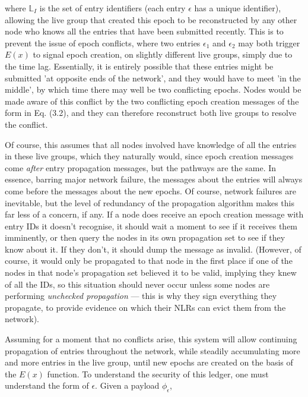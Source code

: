 \documentclass{extreport}
\begin{document}
where \(\mathbb{L}_I\) is the set of entry identifiers (each entry \(\epsilon\) has a unique identifier), allowing the live group that created this epoch to be reconstructed by any other node who knows all the entries that have been submitted recently. This is to prevent the issue of epoch conflicts, where two entries \(\epsilon_1\) and \(\epsilon_2\) may both trigger \(E(x)\) to signal epoch creation, on slightly different live groups, simply due to the time lag. Essentially, it is entirely possible that these entries might be submitted 'at opposite ends of the network', and they would have to meet 'in the middle', by which time there may well be two conflicting epochs. Nodes would be made aware of this conflict by the two conflicting epoch creation messages of the form in Eq. (3.2), and they can therefore reconstruct both live groups to resolve the conflict.

Of course, this assumes that all nodes involved have knowledge of all the entries in these live groups, which they naturally would, since epoch creation messages come \emph{after} entry propagation messages, but the pathways are the same. In essence, barring major network failure, the messages about the entries will always come before the messages about the new epochs. Of course, network failures are inevitable, but the level of redundancy of the propagation algorithm makes this far less of a concern, if any. If a node does receive an epoch creation message with entry IDs it doesn't recognise, it should wait a moment to see if it receives them imminently, or then query the nodes in its own propagation set to see if they know about it. If they don't, it should dump the message as invalid. (However, of course, it would only be propagated to that node in the first place if one of the nodes in that node's propagation set believed it to be valid, implying they knew of all the IDs, so this situation should never occur unless some nodes are performing \emph{unchecked propagation} --- this is why they sign everything they propagate, to provide evidence on which their NLRs can evict them from the network).

Assuming for a moment that no conflicts arise, this system will allow continuing propagation of entries throughout the network, while steadily accumulating more and more entries in the live group, until new epochs are created on the basis of the \(E(x)\) function. To understand the security of this ledger, one must understand the form of \(\epsilon\). Given a payload \(\phi_\epsilon\),
\end{document}
